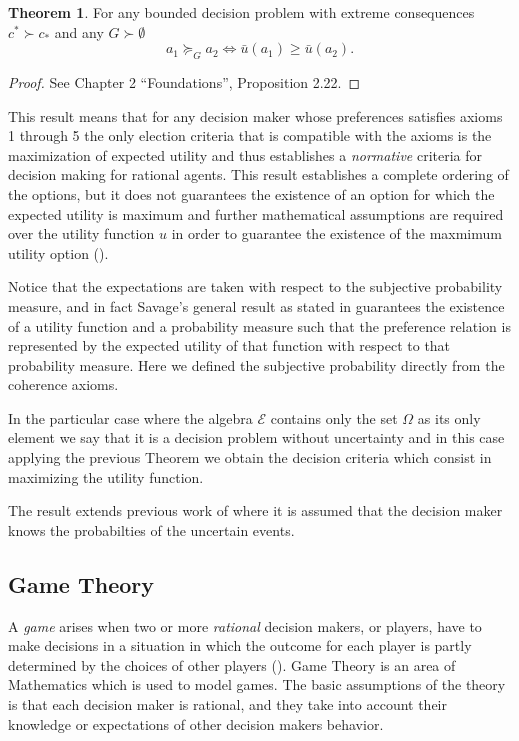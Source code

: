 \documentclass[english,letterpaper,12pt,final]{article}
\theoremstyle{definition}
\newtheorem{teo}{Theorem}[section]
\begin{document}
	\begin{teo}
	For any bounded decision problem with extreme consequences $c^\ast \succ c_\ast$ and any $G \succ \emptyset$
	\[ a_1 \succeq_G a_2 \Leftrightarrow \bar{u}(a_1) \geq \bar{u}(a_2). \]
	\end{teo}
	\begin{proof}
	See \cite{bernardo2000bayesian} Chapter 2 “Foundations”, Proposition 2.22.
	\end{proof}
	This result means that for any decision maker whose preferences satisfies axioms 1 through 5 the only election criteria that is compatible with the axioms is the maximization of expected utility and thus establishes a \textit{normative} criteria for decision making for rational agents. This result establishes a complete ordering of the options, but it does not guarantees the existence of an option for which the expected utility is maximum and further mathematical assumptions are required over the utility function $u$ in order to guarantee the existence of the maxmimum utility option (\cite{bernardo2000bayesian}).
	
	Notice that the expectations are taken with respect to the subjective probability measure, and in fact Savage's general result as stated in \cite{gilboa2009decision} guarantees the existence of a utility function and a probability measure such that the preference relation is represented by the expected utility of that function with respect to that probability measure. Here we defined the subjective probability directly from the coherence axioms.
	
	In the particular case where the algebra $\mathcal{E}$ contains only the set $\Omega$ as its only element we say that it is a decision problem without uncertainty and in this case applying the previous Theorem we obtain the decision criteria which consist in maximizing the utility function.
	
	The result extends previous work of \cite{von1944theory} where it is assumed that the decision maker knows the probabilties of the uncertain events.
	\subsection{Game Theory}
	A \textit{game} arises when two or more \textit{rational} decision makers, or players, have to make decisions in a situation in which the outcome for each player is partly determined by the choices of other players (\cite{binmore2008rational}). Game Theory is an area of Mathematics which is used to model games. The basic assumptions of the theory is that each decision maker is rational, and they take into account their knowledge or expectations of other decision makers behavior.
	
\end{document}

